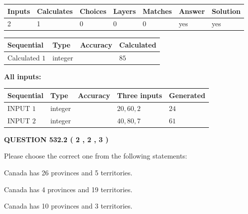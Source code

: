 \documentclass[12pt]{article}
\begin{document}
   
\noindent\begin{tabular}{|l|l|l|l|l|l|l|}
 \hline
Inputs & Calculates & Choices & Layers & Matches & Answer & Solution \\ \hline
 2  & 
 1  & 
 0
  & 
 0  & 
 0  & 
  yes & 
  yes 
  \\ \hline
 \end{tabular}
   
   
   
   
\noindent{}
   
   
  
  
\noindent\begin{tabular}{|l|l|l|l|}
\hline
 Sequential & Type & Accuracy & Calculated \\ 
\hline
 
 
  Calculated $  1 $ & integer &  & 
  $ 85 $ 
 \\  \hline  
 \end{tabular}
   
   
   
   
\noindent\vspace{0.1in}\hspace{-0.08in} {\textbf{\Large{All inputs: }}}
   
   
  
  
\noindent\begin{tabular}{|l|l|l|l|l|}
\hline
 Sequential & Type & Accuracy & Three inputs & Generated \\ 
\hline
 
 
  INPUT $  1 $ & integer &  & $
 20
 , 
 60
 , 
 2
 $ & $ 24 $ 
 \\  \hline  
 
 
  INPUT $  2 $ & integer &  & $
 40
 , 
 80
 , 
 7
 $ & $ 61 $ 
 \\  \hline  
 \end{tabular}
   
   
  
\vspace{0.2in}
  
{\textbf{\Large{QUESTION
532.2 
 ( 2 , 2 , 3 )
}}}
  
  
Please choose the correct one from the following statements:
 
 
Canada has  26 provinces and  5 territories.
 
 
Canada has   4 provinces and  19 territories.
 
 
Canada has 10  provinces and 3 territories.
 
\end{document}
